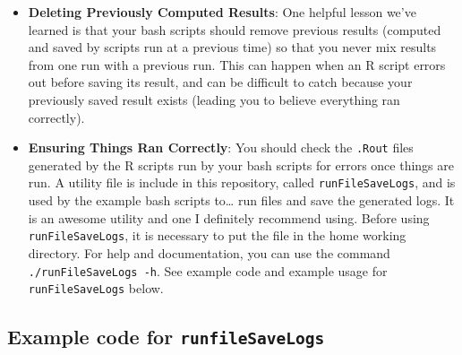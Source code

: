 \documentclass[
]{book}
\begin{document}
\begin{itemize}
\item
  \textbf{Deleting Previously Computed Results}: One helpful lesson we've learned is that your bash scripts should remove previous results (computed and saved by scripts run at a previous time) so that you never mix results from one run with a previous run. This can happen when an R script errors out before saving its result, and can be difficult to catch because your previously saved result exists (leading you to believe everything ran correctly).
\item
  \textbf{Ensuring Things Ran Correctly}: You should check the \texttt{.Rout} files generated by the R scripts run by your bash scripts for errors once things are run. A utility file is include in this repository, called \texttt{runFileSaveLogs}, and is used by the example bash scripts to\ldots{} run files and save the generated logs. It is an awesome utility and one I definitely recommend using. Before using \texttt{runFileSaveLogs}, it is necessary to put the file in the home working directory. For help and documentation, you can use the command \texttt{./runFileSaveLogs\ -h}. See example code and example usage for \texttt{runFileSaveLogs} below.
\end{itemize}

\subsection{\texorpdfstring{Example code for \texttt{runfileSaveLogs}}{Example code for runfileSaveLogs}}\label{example-code-for-runfilesavelogs}
\end{document}
